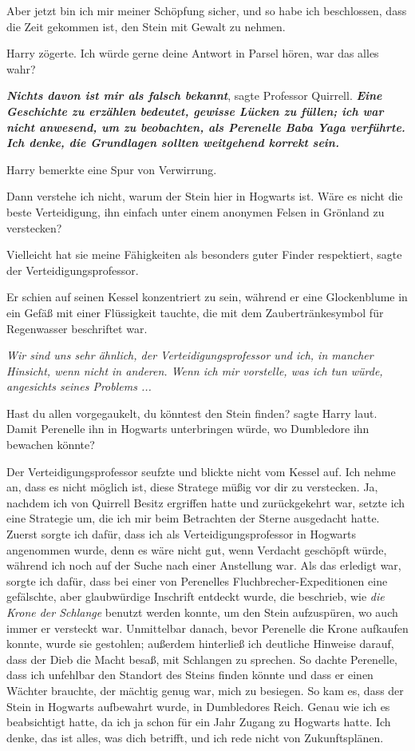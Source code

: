 \glqq{}Aber jetzt bin ich mir meiner Schöpfung sicher, und so habe ich
beschlossen, dass die Zeit gekommen ist, den Stein mit Gewalt zu nehmen.\grqq{}

Harry zögerte. \glqq{}Ich würde gerne deine Antwort in Parsel hören, war das
alles wahr?\grqq{}

\glqq{}\textbf{\emph{Nichts davon ist mir als falsch bekannt}}\grqq{}, sagte
Professor Quirrell. \glqq{}\textbf{\emph{Eine Geschichte zu erzählen bedeutet,
gewisse Lücken zu füllen; ich war nicht anwesend, um zu beobachten, als
Perenelle Baba Yaga verführte. Ich denke, die Grundlagen sollten weitgehend
korrekt sein.\grqq{}} }

Harry bemerkte eine Spur von Verwirrung.

\glqq{}Dann verstehe ich nicht, warum der Stein hier in Hogwarts ist. Wäre es
nicht die beste Verteidigung, ihn einfach unter einem anonymen Felsen in
Grönland zu verstecken?\grqq{}

\glqq{}Vielleicht hat sie meine Fähigkeiten als besonders guter Finder
respektiert\grqq{}, sagte der Verteidigungsprofessor.

Er schien auf seinen Kessel konzentriert zu sein, während er eine Glockenblume
in ein Gefäß mit einer Flüssigkeit tauchte, die mit dem Zaubertränkesymbol für
Regenwasser beschriftet war.

\emph{Wir sind uns sehr ähnlich, der Verteidigungsprofessor und ich, in mancher
Hinsicht, wenn nicht in anderen. Wenn ich mir vorstelle, was ich tun würde,
angesichts seines Problems ...}

\glqq{}Hast du allen vorgegaukelt, du könntest den Stein finden?\grqq{} sagte
Harry laut. \glqq{}Damit Perenelle ihn in Hogwarts unterbringen würde, wo
Dumbledore ihn bewachen könnte?\grqq{}

Der Verteidigungsprofessor seufzte und blickte nicht vom Kessel auf. \glqq{}Ich
nehme an, dass es nicht möglich ist, diese Stratege müßig vor dir zu verstecken.
Ja, nachdem ich von Quirrell Besitz ergriffen hatte und zurückgekehrt war,
setzte ich eine Strategie um, die ich mir beim Betrachten der Sterne ausgedacht
hatte. Zuerst sorgte ich dafür, dass ich als Verteidigungsprofessor in Hogwarts
angenommen wurde, denn es wäre nicht gut, wenn Verdacht geschöpft würde, während
ich noch auf der Suche nach einer Anstellung war. Als das erledigt war, sorgte
ich dafür, dass bei einer von Perenelles Fluchbrecher-Expeditionen eine
gefälschte, aber glaubwürdige Inschrift entdeckt wurde, die beschrieb, wie
\emph{die Krone der Schlange} benutzt werden konnte, um den Stein aufzuspüren,
wo auch immer er versteckt war. Unmittelbar danach, bevor Perenelle die Krone
aufkaufen konnte, wurde sie gestohlen; außerdem hinterließ ich deutliche
Hinweise darauf, dass der Dieb die Macht besaß, mit Schlangen zu sprechen. So
dachte Perenelle, dass ich unfehlbar den Standort des Steins finden könnte und
dass er einen Wächter brauchte, der mächtig genug war, mich zu besiegen. So kam
es, dass der Stein in Hogwarts aufbewahrt wurde, in Dumbledores Reich. Genau wie
ich es beabsichtigt hatte, da ich ja schon für ein Jahr Zugang zu Hogwarts
hatte. Ich denke, das ist alles, was dich betrifft, und ich rede nicht von
Zukunftsplänen.\grqq{}

